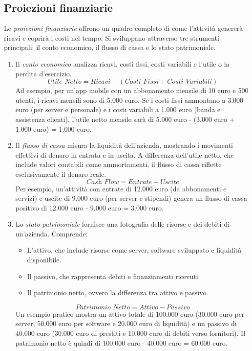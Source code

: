 \subsection{Proiezioni finanziarie}
Le \textit{proiezioni finanziarie} offrono un quadro completo di come l’attività genererà ricavi e coprirà i costi nel tempo. Si sviluppano attraverso tre strumenti principali: il conto economico, il flusso di cassa e lo stato patrimoniale.
\begin{enumerate}
    \item Il \textit{conto economico} analizza ricavi, costi fissi, costi variabili e l’utile o la perdita d’esercizio.
    \begin{equation*}
        \textit{Utile Netto} = \textit{Ricavi} - (\textit{Costi Fissi} + \textit{Costi Variabili})
    \end{equation*}
    Ad esempio, per un’app mobile con un abbonamento mensile di 10 euro e 500 utenti, i ricavi mensili sono di 5.000 euro. Se i costi fissi ammontano a 3.000 euro (per server e personale) e i costi variabili a 1.000 euro (banda e assistenza clienti), l’utile netto mensile sarà di 5.000 euro - (3.000 euro + 1.000 euro) = 1.000 euro.

    \item Il \textit{flusso di cassa} misura la liquidità dell’azienda, mostrando i movimenti effettivi di denaro in entrata e in uscita. A differenza dell’utile netto, che include valori contabili come ammortamenti, il flusso di cassa riflette esclusivamente il denaro reale. 
    \begin{equation*}
        \textit{Cash Flow} = \textit{Entrate} - \textit{Uscite}
    \end{equation*}
    Per esempio, un’attività con entrate di 12.000 euro (da abbonamenti e servizi) e uscite di 9.000 euro (per server e stipendi) genera un flusso di cassa positivo di 12.000 euro - 9.000 euro = 3.000 euro.

    \item Lo \textit{stato patrimoniale} fornisce una fotografia delle risorse e dei debiti di un’azienda. Comprende:
    \begin{itemize}
        \item L’attivo, che include risorse come server, software sviluppato e liquidità disponibile.
        \item Il passivo, che rappresenta debiti e finanziamenti ricevuti.
        \item Il patrimonio netto, ovvero la differenza tra attivo e passivo.
    \end{itemize}
    \begin{equation*}
        \textit{Patrimonio Netto} = \textit{Attivo} - \textit{Passivo}
    \end{equation*}
    Un esempio pratico mostra un attivo totale di 100.000 euro (30.000 euro per server, 50.000 euro per software e 20.000 euro di liquidità) e un passivo di 40.000 euro (30.000 euro di prestiti e 10.000 euro di debiti verso fornitori). Il patrimonio netto è quindi di 100.000 euro - 40.000 euro = 60.000 euro.
\end{enumerate}

